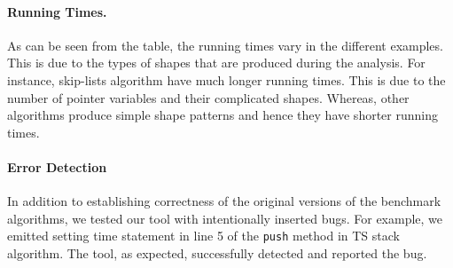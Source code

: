 \paragraph{Running Times.}
As can be seen from the table, the running times
vary in the different examples.
%
This is due to the types of shapes that are produced during the analysis.
%
For instance, skip-lists algorithm have much longer running times. This is due to 
the number of pointer variables and their complicated shapes. Whereas, other algorithms 
produce simple shape patterns and hence they have shorter running times.
\paragraph{Error Detection}
 In addition to establishing correctness of the original versions of the
benchmark algorithms, we tested our tool with intentionally inserted bugs. For example, we emitted setting time statement in line 5 of the {\tt push} method in TS stack algorithm. The tool, as expected, successfully detected and reported the bug.
 



